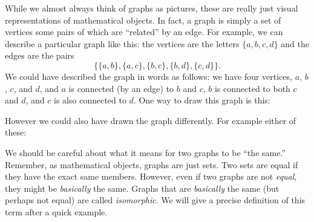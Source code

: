 \documentclass[12pt]{article}
\begin{document}
While we almost always think of graphs as pictures, these are really just visual representations of mathematical objects.  In fact, a graph is simply a set of vertices some pairs of which are ``related'' by an edge.  For example, we can describe a particular graph like this: the vertices are the letters $\{a,b,c,d\}$ and the edges are the pairs \[\{\{a,b\}, \{a,c\}, \{b,c\}, \{b,d\}, \{c,d\}\}.\]  %
We could have described the graph in words as follows: we have four vertices, $a$, $b$, $c$, and $d$, and $a$ is connected (by an edge) to $b$ and $c$, $b$ is connected to both $c$ and $d$, and $c$ is also connected to $d$.  One way to draw this graph is this:
\begin{center}
\end{center}

However we could also have drawn the graph differently.  For example either of these:

\begin{center}
  \hspace{1in}
\end{center}

We should be careful about what it means for two graphs to be ``the same.''  Remember, as mathematical objects, graphs are just sets.  Two sets are equal if they have the exact same members.  However, even if two graphs are not \emph{equal}, they might be \emph{basically} the same.  Graphs that are \emph{basically} the same (but perhaps not equal) are called \emph{isomorphic}.  We will give a precise definition of this term after a quick example.
\end{document}
